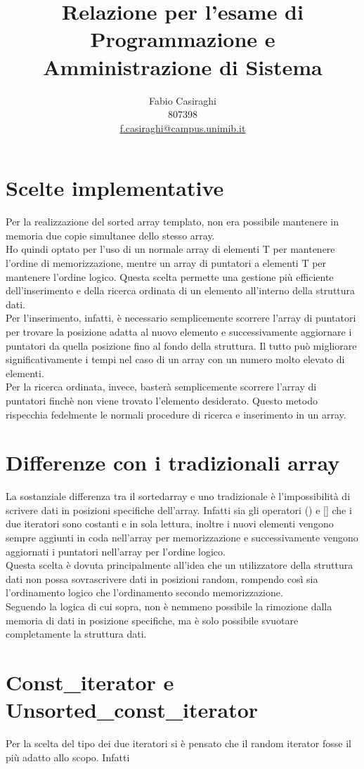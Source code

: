 \documentclass[11pt]{article}
\author{Fabio Casiraghi \\807398 \\ \href{mailto:f.casiraghi@campus.unimib.it} {f.casiraghi@campus.unimib.it}}
\title{Relazione per l'esame di Programmazione e Amministrazione di Sistema}
\begin{document}
\maketitle
\vspace{2cm}

\section*{Scelte implementative}
Per la realizzazione del sorted array templato, non era possibile mantenere in memoria
due copie simultanee dello stesso array. \\
Ho quindi optato per l'uso di un normale array di elementi T per mantenere l'ordine di memorizzazione,
mentre un array di puntatori a elementi T per mantenere l'ordine logico. Questa scelta permette
una gestione più efficiente dell'inserimento e della ricerca ordinata di un elemento all'interno della
struttura dati.\\
Per l'inserimento, infatti, è necessario semplicemente scorrere l'array di puntatori per trovare la 
posizione adatta al nuovo elemento e successivamente aggiornare i puntatori da quella posizione fino al fondo
della struttura. Il tutto può migliorare significativamente i tempi nel caso di un array 
con un numero molto elevato di elementi.\\
Per la ricerca ordinata, invece, basterà semplicemente scorrere l'array di puntatori finchè non viene 
trovato l'elemento desiderato. Questo metodo rispecchia fedelmente le normali procedure di ricerca e inserimento 
in un array.
\section*{Differenze con i tradizionali array}
La sostanziale differenza tra il sortedarray e uno tradizionale è l'impossibilità di scrivere dati in posizioni specifiche dell'array. Infatti sia gli operatori () e [] che i due iteratori sono costanti e in sola lettura, inoltre i nuovi elementi vengono sempre aggiunti in coda nell'array per memorizzazione e successivamente vengono aggiornati i puntatori nell'array per l'ordine logico.\\
Questa scelta è dovuta principalmente all'idea che un utilizzatore della struttura dati non possa sovrascrivere dati in posizioni random, rompendo così sia l'ordinamento logico che l'ordinamento secondo memorizzazione.\\
Seguendo la logica di cui sopra, non è nemmeno possibile la rimozione dalla memoria di dati in posizione specifiche, ma è solo possibile svuotare completamente la struttura dati.
\section*{Const_iterator e Unsorted_const_iterator}
Per la scelta del tipo dei due iteratori si è pensato che il random iterator fosse il più adatto allo scopo. Infatti 
\end{document}
